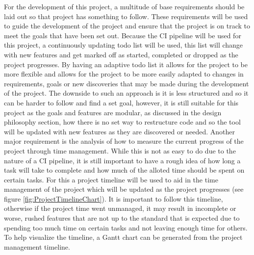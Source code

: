 For the development of this project, a multitude of base requirements should be laid out so that project has something to follow. These requirements will be used to guide the development of the project and ensure that the project is on track to meet the goals that have been set out.
Because the CI pipeline will be used for this project, a continuously updating todo list will be used, this list will change with new features and get marked off as started, completed or dropped as the project progresses. By having an adaptive todo list it allows for the project to be more flexible and allows for the project to be more easily adapted to changes in requirements, goals or new discoveries that may be made during the development of the project. The downside to such an approach is it is less structured and so it can be harder to follow and find a set goal, however, it is still suitable for this project as the goals and features are modular, as discussed in the design philosophy section, how there is no set way to restructure code and so the tool will be updated with new features as they are discovered or needed.
Another major requirement is the analysis of how to measure the current progress of the project through time management. While this is not as easy to do due to the nature of a CI pipeline, it is still important to have a rough idea of how long a task will take to complete and how much of the alloted time should be spent on certain tasks. For this a project timeline will be used to aid in the time management of the project which will be updated as the project progresses (see figure \ref{fig:ProjectTimelineChart}). It is important to follow this timeline, otherwise if the project time went unmanaged, it may result in incomplete or worse, rushed features that are not up to the standard that is expected due to spending too much time on certain tasks and not leaving enough time for others. To help visualize the timeline, a Gantt chart can be generated from the project management timeline.

